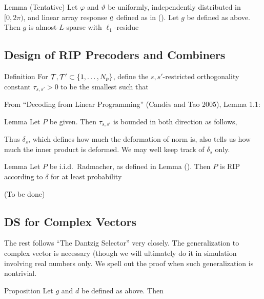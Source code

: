 \Result
{Lemma (Tentative)}
{
Let \(\varphi\) and \(\vartheta\) be uniformly, independently distributed in \([0,2\pi)\), and linear array response \(\V{a}\) defined as in ().
Let \(g\) be defined as above.
Then \(g\) is almost-\(L\)-sparse with \(\ell_1\)-residue
%
}

\subsection{Design of RIP Precoders and Combiners}

\Result
{Definition}
{
For \(\mathcal{T}, \mathcal{T}' \subset \{1, \dotsc, N_p\}\), define the \(s,s'\)-restricted orthogonality constant \(\tau_{s,s'} >0\) to be the smallest such that
%
}

From ``Decoding from Linear Programming'' (Cand\`es and Tao 2005), Lemma 1.1:

\Result
{Lemma}
{
Let \(P\) be given.
Then \(\tau_{s, s'}\) is bounded in both direction as follows,
}

Thus \(\delta_s\), which defines how much the deformation of norm is, also tells us how much the inner product is deformed.
We may well keep track of \(\delta_s\) only.

\Result
{Lemma}
{
Let \(P\) be i.i.d.\ Radmacher, as defined in Lemma ().
Then \(P\) is RIP according to \(\delta\) for at least probability
}


{ \color{red} (To be done) }

\subsection{DS for Complex Vectors}

The rest follows ``The Dantzig Selector'' very closely.
The generalization to complex vector is necessary (though we will ultimately do it in simulation involving real numbers only.
We spell out the proof when such generalization is nontrivial.

\Result
{Proposition}
{
Let \(g\) and \(d\) be defined as above.
Then
%
}


